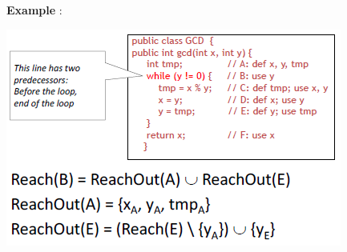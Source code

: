 \documentclass{article}
\begin{document}
\noindent \textbf{Example} :
\begin{center}
        \includegraphics[scale = 0.7]{image/13.PNG}
\end{center}
\end{document}
